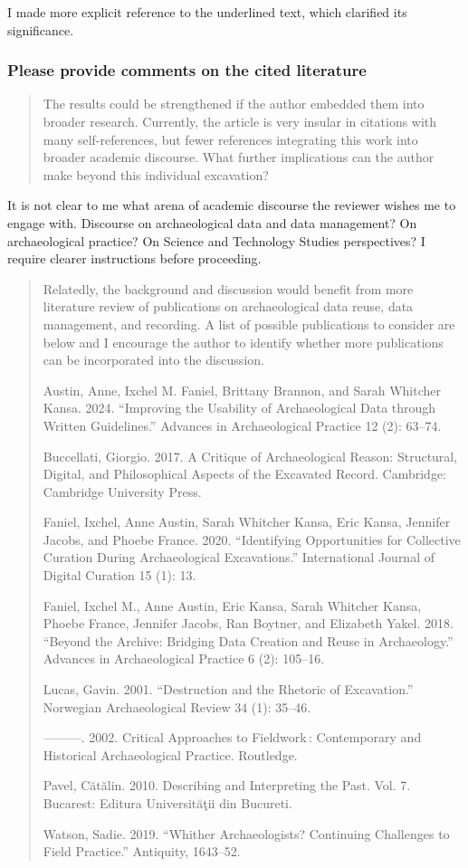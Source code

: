 \documentclass[
]{article}
\begin{document}
I made more explicit reference to the underlined text, which clarified
its significance.

\subsubsection{Please provide comments on the cited
literature}\label{please-provide-comments-on-the-cited-literature}

\begin{quote}
The results could be strengthened if the author embedded them into
broader research. Currently, the article is very insular in citations
with many self-references, but fewer references integrating this work
into broader academic discourse. What further implications can the
author make beyond this individual excavation?
\end{quote}

It is not clear to me what arena of academic discourse the reviewer
wishes me to engage with. Discourse on archaeological data and data
management? On archaeological practice? On Science and Technology
Studies perspectives? I require clearer instructions before proceeding.

\begin{quote}
Relatedly, the background and discussion would benefit from more
literature review of publications on archaeological data reuse, data
management, and recording. A list of possible publications to consider
are below and I encourage the author to identify whether more
publications can be incorporated into the discussion.

Austin, Anne, Ixchel M. Faniel, Brittany Brannon, and Sarah Whitcher
Kansa. 2024. ``Improving the Usability of Archaeological Data through
Written Guidelines.'' Advances in Archaeological Practice 12 (2):
63--74.

Buccellati, Giorgio. 2017. A Critique of Archaeological Reason:
Structural, Digital, and Philosophical Aspects of the Excavated Record.
Cambridge: Cambridge University Press.

Faniel, Ixchel, Anne Austin, Sarah Whitcher Kansa, Eric Kansa, Jennifer
Jacobs, and Phoebe France. 2020. ``Identifying Opportunities for
Collective Curation During Archaeological Excavations.'' International
Journal of Digital Curation 15 (1): 13.

Faniel, Ixchel M., Anne Austin, Eric Kansa, Sarah Whitcher Kansa, Phoebe
France, Jennifer Jacobs, Ran Boytner, and Elizabeth Yakel. 2018.
``Beyond the Archive: Bridging Data Creation and Reuse in Archaeology.''
Advances in Archaeological Practice 6 (2): 105--16.

Lucas, Gavin. 2001. ``Destruction and the Rhetoric of Excavation.''
Norwegian Archaeological Review 34 (1): 35--46.

---------. 2002. Critical Approaches to Fieldwork\,: Contemporary and
Historical Archaeological Practice. Routledge.

Pavel, Cătălin. 2010. Describing and Interpreting the Past. Vol. 7.
Bucarest: Editura Universităţii din Bucureti.

Watson, Sadie. 2019. ``Whither Archaeologists? Continuing Challenges to
Field Practice.'' Antiquity, 1643--52.
\end{quote}
\end{document}
